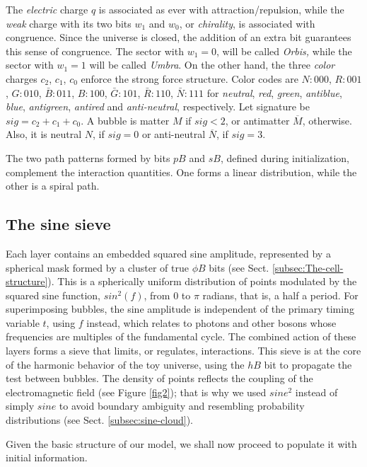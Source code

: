 \documentclass[12pt]{article}
\begin{document}
The \emph{electric} charge $q$ is associated as ever with attraction/repulsion, while the \emph{weak} charge with its two bits $w_{1}$ and $w_{0}$, or \emph{chirality}, is associated with congruence. Since the universe is closed, the addition of an extra bit guarantees this sense of congruence. The sector with $w_{1}=0$, will be called \emph{Orbis, }while the sector with $w_{1}=1$ will be called \emph{Umbra}. On the other hand, the three \emph{color} charges $c_{2}$, $c_{1}$, $c_{0}$ enforce the strong force structure. Color codes are $N:000$, $R:001$, $G:010$, $\bar{B}:011$, $B:100$, $\bar{G}:101$, $\bar{R}:110$, $\bar{N}:111$ for \emph{neutral}, \emph{red}, \emph{green}, \emph{antiblue}, \emph{blue}, \emph{antigreen}, \emph{antired} and \emph{anti-neutral}, respectively. Let signature be $sig=c_{2}+c_{1}+c_{0}$. A bubble is matter $M$ if $sig<2$, or antimatter $\overline{M}$, otherwise. Also, it is neutral $N$, if $sig=0$ or anti-neutral $\overline{N}$, if $sig=3$.

The two path patterns formed by bits $pB$ and $sB$, defined during initialization,  complement the interaction quantities. One forms a linear distribution, while the other is a spiral path.

\subsection{The sine sieve}\label{subsec:Sine}

Each layer contains an embedded squared sine amplitude, represented by a spherical mask formed by a cluster of true $\phi B$ bits (see Sect. \ref{subsec:The-cell-structure}). This is a spherically uniform distribution of points modulated by the squared sine function, $sin^2(f)$, from $0$ to $\pi$ radians, that is, a half a period. For superimposing bubbles, the sine amplitude is independent of the primary timing variable \( t \), using $f$ instead, which relates to photons and other bosons whose frequencies are multiples of the fundamental cycle. The combined action of these layers forms a sieve that limits, or regulates, interactions. This sieve is at the core of the harmonic behavior of the toy universe, using the $hB$ bit to propagate the test between bubbles. The density of points reflects the coupling of the electromagnetic field  (see Figure \ref{fig2}); that is why we used $sine^2$ instead of simply $sine$ to avoid boundary ambiguity and resembling probability distributions (see Sect. \ref{subsec:sine-cloud}).

Given the basic structure of our model, we shall now proceed to populate it with initial information.
\end{document}
